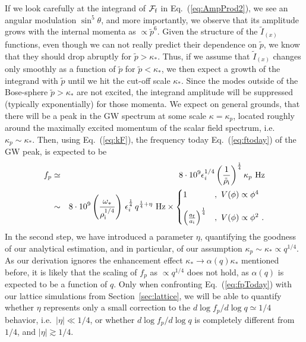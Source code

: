 \documentclass[a4paper,11pt]{article}
\begin{document}
If we look carefully at the integrand of $\mathcal{F}_{\rm f}$ in Eq.~(\ref{eq:AmpProd2}), we see an angular modulation $\sin^5\theta$, and more importantly, we observe that its amplitude grows with the internal momenta as $\propto \tilde p^6$. Given the structure of the $\tilde I_{(x)}$ functions, even though we can not really predict their dependence on $\tilde p$, we know that they should drop abruptly for $\tilde p > \kappa_*$. Thus, if we assume that $\tilde I_{(x)}$ changes only smoothly as a function of $\tilde p$ for $\tilde p < \kappa_*$, we then expect a growth of the integrand with $\tilde p$ until we hit the cut-off scale $\kappa_*$. Since the modes outside of the Bose-sphere $\tilde p > \kappa_*$ are not excited, the integrand amplitude will be suppressed (typically exponentially) for those momenta. We expect on general grounds, that there will be a peak in the GW spectrum at some scale $\kappa = \kappa_p$, located roughly around the maximally excited momentum of the scalar field spectrum, i.e. $\kappa_p \sim \kappa_*$. Then, using Eq.~(\ref{eq:kF}), the frequency today Eq.~(\ref{eq:ftoday}) of the GW peak, is expected to be 
\begin{eqnarray}
\label{eq:fpToday}
f_{p} &\simeq& 8\cdot10^{9}\epsilon_i^{1/4}\left(\frac{1}{\tilde{\rho}_{\rm i}}\right)^{\frac{1}{4}}\kappa_p~{\rm Hz}\nonumber\\
&\sim& 8\cdot10^{9}\left(\frac{\omega_*}{{\rho}_{\rm i}^{1/4}}\right)\,\epsilon_i^{\frac{1}{4}}\,q^{\frac{1}{4} + \eta}~{\rm Hz}
\times
\begin{cases}
1 &, ~V(\phi)\propto\phi^{4}\vspace{0.3cm}\\
\left(\frac{a_{\rm f}}{a_{\rm i}}\right)^{\frac{1}{4}} &, ~V(\phi)\propto\phi^{2} \ .
\end{cases}
\end{eqnarray}
In the second step, we have introduced a parameter $\eta$, quantifying the goodness of our analytical estimation, and in particular, of our assumption $\kappa_p \sim \kappa_* \propto q^{1/4}$. As our derivation ignores the enhancement effect $\kappa_* \to \alpha(q)\kappa_*$ mentioned before, it is likely that the scaling of $f_p$ as $\propto q^{1/4}$ does not hold, as $\alpha(q)$ is expected to be a function of $q$. Only when confronting Eq.~(\ref{eq:fpToday}) with our lattice simulations from Section~\ref{sec:lattice}, we will be able to quantify whether $\eta$ represents only a small correction to the $d\log f_p / d\log q \simeq 1/4$ behavior, i.e.~$|\eta| \ll 1/4$, or whether $d\log f_p / d\log q$ is completely different from $1/4$, and $|\eta| \gtrsim 1/4$.
\end{document}
